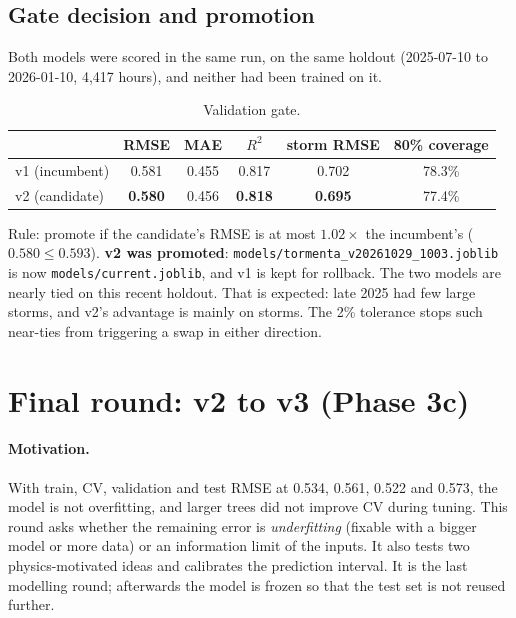 \documentclass[11pt,a4paper]{article}
\newcommand{\code}[1]{\texttt{#1}}
\begin{document}
\subsection{Gate decision and promotion}
Both models were scored in the same run, on the same holdout (2025-07-10 to 2026-01-10, 4{,}417 hours), and
neither had been trained on it.

\begin{table}[H]\centering
\caption{Validation gate.}\label{tab:gate}
\begin{tabular}{lccccc}\toprule
 & RMSE & MAE & $R^2$ & storm RMSE & 80\% coverage\\\midrule
v1 (incumbent) & 0.581 & 0.455 & 0.817 & 0.702 & 78.3\%\\
v2 (candidate) & \textbf{0.580} & 0.456 & \textbf{0.818} & \textbf{0.695} & 77.4\%\\\bottomrule
\end{tabular}
\end{table}
Rule: promote if the candidate's RMSE is at most $1.02\times$ the incumbent's ($0.580 \le 0.593$).
\textbf{v2 was promoted}: \code{models/tormenta\_v20261029\_1003.joblib} is now \code{models/current.joblib}, and v1
is kept for rollback. The two models are nearly tied on this recent holdout. That is expected: late 2025 had few
large storms, and v2's advantage is mainly on storms. The 2\% tolerance stops such near-ties from triggering a
swap in either direction.

\section{Final round: v2 to v3 (Phase 3c)}\label{sec:v3}
\paragraph{Motivation.} With train, CV, validation and test RMSE at 0.534, 0.561, 0.522 and 0.573, the model is not
overfitting, and larger trees did not improve CV during tuning. This round asks whether the remaining error is
\emph{underfitting} (fixable with a bigger model or more data) or an information limit of the inputs. It also tests
two physics-motivated ideas and calibrates the prediction interval. It is the last modelling round; afterwards the
model is frozen so that the test set is not reused further.
\end{document}
